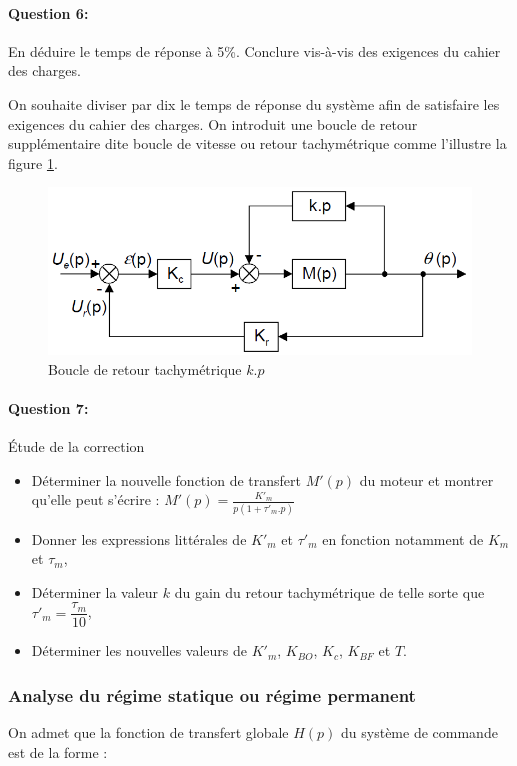 \paragraph{Question 6:} En déduire le temps de réponse à 5\%. Conclure vis-à-vis des exigences du
cahier des charges.

On souhaite diviser par dix le temps de réponse du système afin de satisfaire les exigences du cahier des charges. On introduit une boucle de retour supplémentaire dite boucle de vitesse ou retour tachymétrique comme l'illustre la figure \ref{fig24}.

\begin{figure}[!h]
\centering\includegraphics[width=0.5\linewidth]{img/Tracteur24.png}
\caption{Boucle de retour tachymétrique $k.p$}
\label{fig24}
\end{figure}

\paragraph{Question 7:} Étude de la correction

\begin{itemize}
 \item Déterminer la nouvelle fonction de transfert $M'(p)$ du moteur et montrer qu'elle peut s'écrire : $M'(p)=\frac{K'_m}{p(1+\tau'_m.p)}$

 \item Donner les expressions littérales de $K'_m$ et $\tau'_m$ en fonction notamment de $K_m$ et $\tau_m$,
 \item Déterminer la valeur $k$ du gain du retour tachymétrique de telle sorte que $\tau'_m=\dfrac{\tau_m}{10}$,
 \item Déterminer les nouvelles valeurs de $K'_m$, $K_{BO}$, $K_c$, $K_{BF}$ et $T$.
\end{itemize}

\subsubsection{Analyse du régime statique ou régime permanent}

On admet que la fonction de transfert globale $H(p)$ du système de commande est de la forme :

